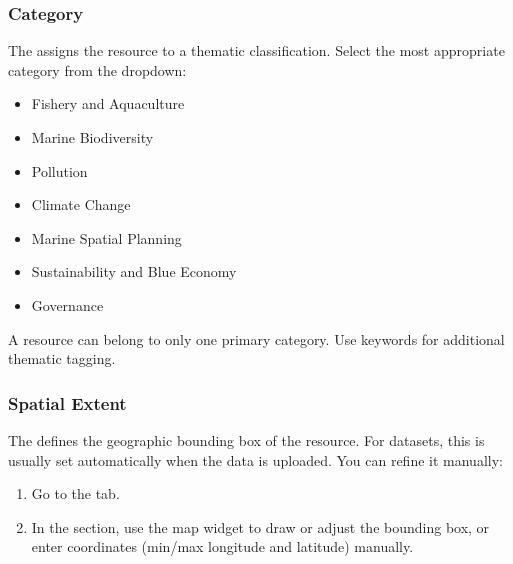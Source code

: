 \documentclass[letterpaper,10pt,english]{sphinxmanual}
\begin{document}
\subsubsection{Category}
\label{\detokenize{en/03_managing_metadata:category}}
\sphinxAtStartPar
The  assigns the resource to a thematic classification.
Select the most appropriate category from the dropdown:
\begin{itemize}
\item {} 
\sphinxAtStartPar
Fishery and Aquaculture

\item {} 
\sphinxAtStartPar
Marine Biodiversity

\item {} 
\sphinxAtStartPar
Pollution

\item {} 
\sphinxAtStartPar
Climate Change

\item {} 
\sphinxAtStartPar
Marine Spatial Planning

\item {} 
\sphinxAtStartPar
Sustainability and Blue Economy

\item {} 
\sphinxAtStartPar
Governance

\end{itemize}

\sphinxAtStartPar
A resource can belong to only one primary category. Use keywords for additional
thematic tagging.


\subsubsection{Spatial Extent}
\label{\detokenize{en/03_managing_metadata:spatial-extent}}
\sphinxAtStartPar
The  defines the geographic bounding box of the resource. For datasets,
this is usually set automatically when the data is uploaded. You can refine it manually:
\begin{enumerate}
%
\item {} 
\sphinxAtStartPar
Go to the  tab.

\item {} 
\sphinxAtStartPar
In the  section, use the map widget to draw or adjust the bounding box,
or enter coordinates (min/max longitude and latitude) manually.

\end{enumerate}
\end{document}
